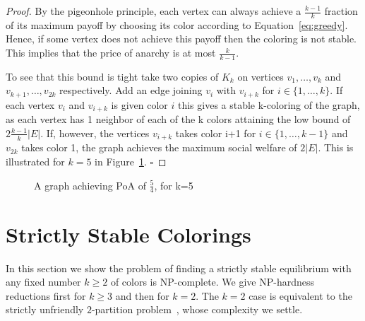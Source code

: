 \documentclass{llncs}
\begin{document}
\begin{proof}
By the pigeonhole principle, each vertex can always achieve a $\frac{k-1}{k}$
fraction of its maximum payoff by choosing its color according to
Equation~\ref{eq:greedy}.  Hence, if some vertex does not achieve this payoff
then the coloring is not stable.  This implies that the price of anarchy is at
most $\frac{k}{k-1}$.

To see that this bound is tight take two copies of $K_k$ on vertices $v_1,
\dots, v_k$ and $v_{k+1}, \dots, v_{2k}$ respectively. Add an edge joining
$v_i$ with $v_{i+k}$ for $i\in \{1,\dots,k\}$. If each vertex $v_i$ and
$v_{i+k}$ is given color $i$ this gives a stable k-coloring of the graph, as
each vertex has 1 neighbor of each of the k colors attaining the low bound of
$2\frac{k-1}{k}|E|$. If, however, the vertices $v_{i+k}$ takes color i+1 for
$i\in\{1,\dots,k-1\}$ and $v_{2k}$ takes color 1, the graph achieves the
maximum social welfare of $2|E|$.  This is illustrated for $k=5$ in
Figure~\ref{fig:k5copies}.
\hfill
$\square$\end{proof}

\begin{figure}[htb]
\centering
{}
\caption{A graph achieving PoA of $\frac{5}{4}$, for k=5}
\label{fig:k5copies}
\end{figure}

\section{Strictly Stable Colorings}

In this section we show the problem of finding a strictly stable equilibrium
with any fixed number $k \geq 2$ of colors is NP-complete.  We give NP-hardness
reductions first for $k \geq 3$ and then for $k=2$.  The $k=2$ case is
equivalent to the strictly unfriendly $2$-partition problem~\cite{ShafiqueD09},
whose complexity we settle.
\end{document}
